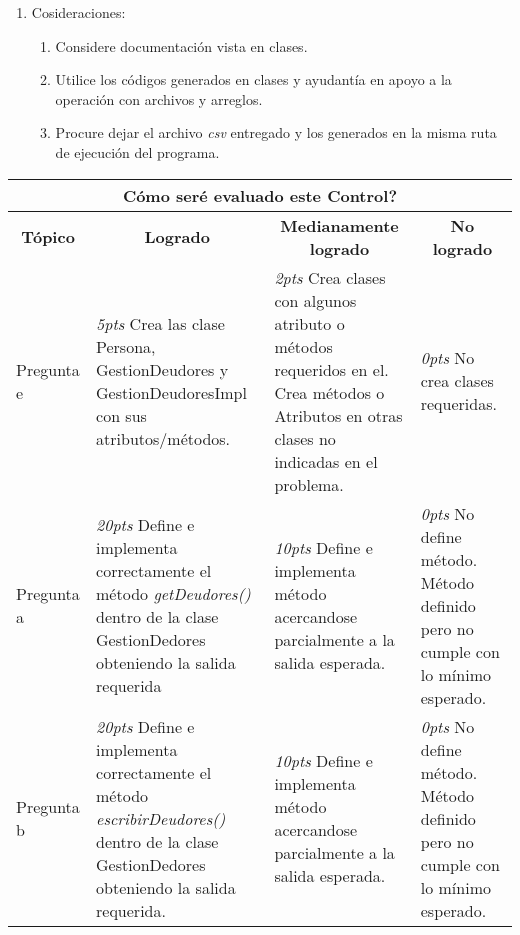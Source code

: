 \documentclass{article}
\begin{document}
	\begin{enumerate}
	   \item[] Cosideraciones:
	    \begin{enumerate}
				\item Considere documentaci\'on vista en clases.
				\item Utilice los c\'odigos generados en clases y ayudant\'ia en apoyo a la operaci\'on con archivos y arreglos.
				\item Procure dejar el archivo \emph{csv} entregado y los generados en la misma ruta de ejecuci\'on del programa.
			\end{enumerate}
	\end{enumerate}

	\begin{table}[!ht]
		 {\scriptsize
			\begin{center}
					 \begin{tabular}{|p{4cm}|p{4cm}|p{4cm}|p{4cm}|}\hline
							\multicolumn{4}{|c|}{\textbf{\textquestiondown C\'omo ser\'e evaluado este Control?} } \\ \hline
							\multicolumn{1}{|c|}{\textbf{T\'opico}} &
							\multicolumn{1}{c|}{\textbf{Logrado}} &
							\multicolumn{1}{c|}{\textbf{Medianamente logrado}} &
							\multicolumn{1}{c|}{\textbf{No logrado}} \\ \hline
							Pregunta e &
							\emph{5pts} Crea las clase Persona, GestionDeudores y  GestionDeudoresImpl con sus atributos/m\'etodos. &
							\emph{2pts} Crea clases con algunos  atributo o m\'etodos	requeridos en el. Crea m\'etodos o Atributos en otras clases no indicadas en el problema. &
							\emph{  0pts} No crea clases requeridas. \\ \hline

							Pregunta a &
							\emph{20pts} Define e implementa correctamente el m\'etodo \emph{getDeudores()}  dentro de la clase GestionDedores obteniendo la salida requerida  &
							\emph{10pts} Define e implementa m\'etodo acercandose parcialmente a la salida esperada. &
							\emph{ 0pts} No define m\'etodo.  M\'etodo definido pero no cumple con lo m\'inimo esperado.\\ \hline

							Pregunta b &
							\emph{20pts} Define e implementa correctamente el m\'etodo \emph{escribirDeudores()}  dentro de la clase GestionDedores obteniendo la salida requerida. &
							\emph{10pts} Define e implementa m\'etodo acercandose parcialmente a la salida esperada. &
							\emph{ 0pts} No define m\'etodo.  M\'etodo definido pero no cumple con lo m\'inimo esperado. \\ \hline


\end{tabular}
\end{center}}
\end{table}
\end{document}
